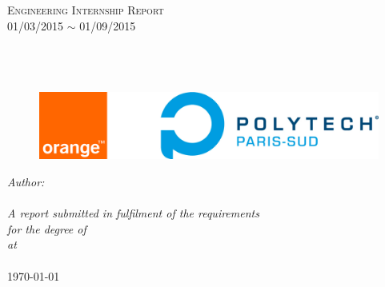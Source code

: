 \documentclass[twoside,11pt,a4paper,openright]{Thesis} %
\begin{document}
\begin{titlepage}
\begin{center}

\textsc{\LARGE Engineering Internship Report}\\[0.1cm]
{\Large 01/03/2015  $\sim$  01/09/2015}\\[0.5cm] %

\HRule \\[0.4cm] %
{\textbf{\huge  \ttitle}}\\[0cm] %
\HRule \\[2.5cm] %

\begin{figure}[htbp]
	\centering
		\includegraphics[width=\textwidth,height=\textheight,keepaspectratio]{Figures/logo.png}
\end{figure}
\vspace{2.2cm}

\emph{\LARGE Author:}\\[0.2cm]
{\LARGE\authornames}\\[2.8cm]%




\large \textit{A report submitted in fulfilment of the requirements\\ for the degree of \degreename}\\[0.3cm] %
\textit{at}\\[0.4cm]
{\Large \groupname}\\[2.5cm] %

{\large \today}\\[4cm] %

\vfill
\end{center}
\cleardoublepage
\end{titlepage}
\end{document}
